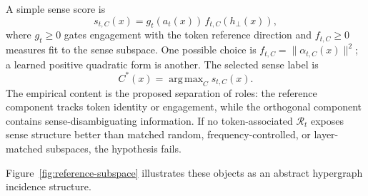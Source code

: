 \documentclass[
  aps,
  reprint,
  superscriptaddress,
  floatfix,
  nofootinbib,
  longbibliography
]{revtex4-2}
\newcommand{\norm}[1]{\lVert #1 \rVert}
\DeclareMathOperator*{\argmax}{arg\,max}
\begin{document}
A simple sense score is
%
\begin{equation}
\label{eq:sense-score}
s_{t,C}(x)=g_t(a_t(x))\,f_{t,C}(h_\perp(x)),
\end{equation}
%
where $g_t\ge0$ gates engagement with the token reference direction and
$f_{t,C}\ge0$ measures fit to the sense subspace. One possible choice is
$f_{t,C}=\norm{\alpha_{t,C}(x)}^2$; a learned positive quadratic form is
another. The selected sense label is
%
\begin{equation}
\label{eq:selected-sense}
C^*(x)=\argmax_C s_{t,C}(x).
\end{equation}
%
The empirical content is the proposed separation of roles: the reference
component tracks token identity or engagement, while the orthogonal
component contains sense-disambiguating information. If no token-associated
$\mathcal R_t$ exposes sense structure better than matched random,
frequency-controlled, or layer-matched subspaces, the hypothesis fails.

Figure~\ref{fig:reference-subspace} illustrates these objects as an abstract
hypergraph incidence structure.
\end{document}

